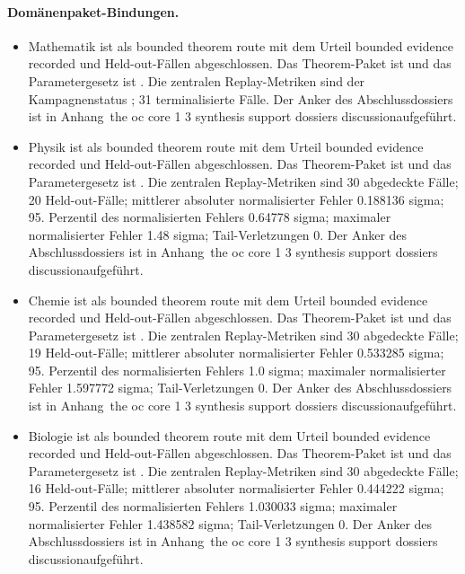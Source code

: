 \paragraph{Domänenpaket-Bindungen.}
\begin{itemize}[leftmargin=1.6em,nosep]
\item Mathematik ist als bounded theorem route mit dem Urteil bounded evidence recorded und  Held-out-Fällen abgeschlossen. Das Theorem-Paket ist  und das Parametergesetz ist . Die zentralen Replay-Metriken sind der Kampagnenstatus ; 31 terminalisierte Fälle. Der Anker des Abschlussdossiers ist in Anhang~the oc core 1 3 synthesis support dossiers discussionaufgeführt.
\item Physik ist als bounded theorem route mit dem Urteil bounded evidence recorded und  Held-out-Fällen abgeschlossen. Das Theorem-Paket ist  und das Parametergesetz ist . Die zentralen Replay-Metriken sind 30 abgedeckte Fälle; 20 Held-out-Fälle; mittlerer absoluter normalisierter Fehler 0.188136 sigma; 95. Perzentil des normalisierten Fehlers 0.64778 sigma; maximaler normalisierter Fehler 1.48 sigma; Tail-Verletzungen 0. Der Anker des Abschlussdossiers ist in Anhang~the oc core 1 3 synthesis support dossiers discussionaufgeführt.
\item Chemie ist als bounded theorem route mit dem Urteil bounded evidence recorded und  Held-out-Fällen abgeschlossen. Das Theorem-Paket ist  und das Parametergesetz ist . Die zentralen Replay-Metriken sind 30 abgedeckte Fälle; 19 Held-out-Fälle; mittlerer absoluter normalisierter Fehler 0.533285 sigma; 95. Perzentil des normalisierten Fehlers 1.0 sigma; maximaler normalisierter Fehler 1.597772 sigma; Tail-Verletzungen 0. Der Anker des Abschlussdossiers ist in Anhang~the oc core 1 3 synthesis support dossiers discussionaufgeführt.
\item Biologie ist als bounded theorem route mit dem Urteil bounded evidence recorded und  Held-out-Fällen abgeschlossen. Das Theorem-Paket ist  und das Parametergesetz ist . Die zentralen Replay-Metriken sind 30 abgedeckte Fälle; 16 Held-out-Fälle; mittlerer absoluter normalisierter Fehler 0.444222 sigma; 95. Perzentil des normalisierten Fehlers 1.030033 sigma; maximaler normalisierter Fehler 1.438582 sigma; Tail-Verletzungen 0. Der Anker des Abschlussdossiers ist in Anhang~the oc core 1 3 synthesis support dossiers discussionaufgeführt.

\end{itemize}
